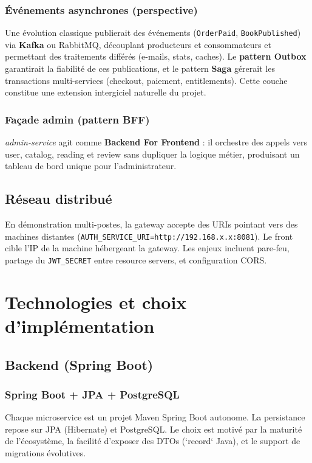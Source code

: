 \documentclass[12pt,a4paper]{report}
\begin{document}
\subsection{Événements asynchrones (perspective)}
Une évolution classique publierait des événements (\texttt{OrderPaid}, \texttt{BookPublished}) via \textbf{Kafka} ou RabbitMQ, découplant producteurs et consommateurs et permettant des traitements différés (e-mails, stats, caches). Le \textbf{pattern Outbox} garantirait la fiabilité de ces publications, et le pattern \textbf{Saga} gérerait les transactions multi-services (checkout, paiement, entitlements). Cette couche constitue une extension intergiciel naturelle du projet.\par

\subsection{Façade admin (pattern BFF)}
\textit{admin-service} agit comme \textbf{Backend For Frontend} : il orchestre des appels vers user, catalog, reading et review sans dupliquer la logique métier, produisant un tableau de bord unique pour l'administrateur.\par

\section{Réseau distribué}
En démonstration multi-postes, la gateway accepte des URIs pointant vers des machines distantes (\texttt{AUTH\_SERVICE\_URI=http://192.168.x.x:8081}). Le front cible l'IP de la machine hébergeant la gateway. Les enjeux incluent pare-feu, partage du \texttt{JWT\_SECRET} entre resource servers, et configuration CORS.\par

\chapter{Technologies et choix d'implémentation}
\section{Backend (Spring Boot)}
\subsection{Spring Boot + JPA + PostgreSQL}
Chaque microservice est un projet Maven Spring Boot autonome. La persistance repose sur JPA (Hibernate) et PostgreSQL. Le choix est motivé par la maturité de l'écosystème, la facilité d'exposer des DTOs (`record` Java), et le support de migrations évolutives.\par
\end{document}
